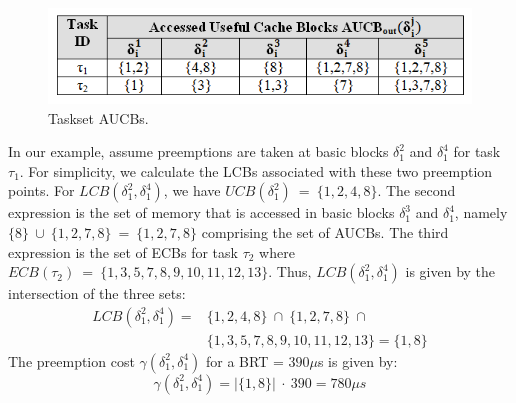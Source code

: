 \vspace{-10pt}
\begin{figure}[h!]
\begin{center}
\includegraphics[width=\linewidth]{taskset_aucbs.png}
\caption{Taskset AUCBs.}
\label{fig:taskset_aucbs}
\end{center}
\end{figure}
\vspace{-10pt}
\newline
\noindent
In our example, assume preemptions are taken at basic blocks \begin{math}\delta_{1}^{2}\end{math} and \begin{math}\delta_{1}^{4}\end{math} for task \begin{math}\tau_{1}\end{math}. For simplicity, we calculate the LCBs associated with these two preemption points.  For $LCB(\delta_{1}^{2},\delta_{1}^{4})$, we have $UCB(\delta_{1}^{2})\ =\ \{1,2,4,8\}$.  The second expression is the set of memory that is accessed in basic blocks $\delta_{1}^{3}$ and $\delta_{1}^{4}$, namely $\{8\}\ \cup\ \{1,2,7,8\}\ =\ \{1,2,7,8\}$ comprising the set of AUCBs.  The third expression is the set of ECBs for task $\tau_{2}$ where $ECB(\tau_{2})\ =\ \{1,3,5,7,8,9,10,11,12,13\}$. Thus, $LCB(\delta_{1}^{2},\delta_{1}^{4})$ is given by the intersection of the three sets:
\begin{equation*}\label{eqn:lcb-example-1}
\begin{split}
    LCB(\delta_{1}^{2},\delta_{1}^{4}) = &\{1,2,4,8\}\ \cap\ \{1,2,7,8\}\ \cap\ \\&\{1,3,5,7,8,9,10,11,12,13\} = \{1,8\}
\end{split}
\end{equation*}
\noindent
The preemption cost $\gamma(\delta_{1}^{2},\delta_{1}^{4})$ for a BRT = $390\mu$s is given by:
\begin{equation*}\label{eqn:gamma-example-1}
    \gamma(\delta_{1}^{2},\delta_{1}^{4}) = |\{1,8\}|\ \cdot\ 390 = 780\mu\textit{s}
\end{equation*}
